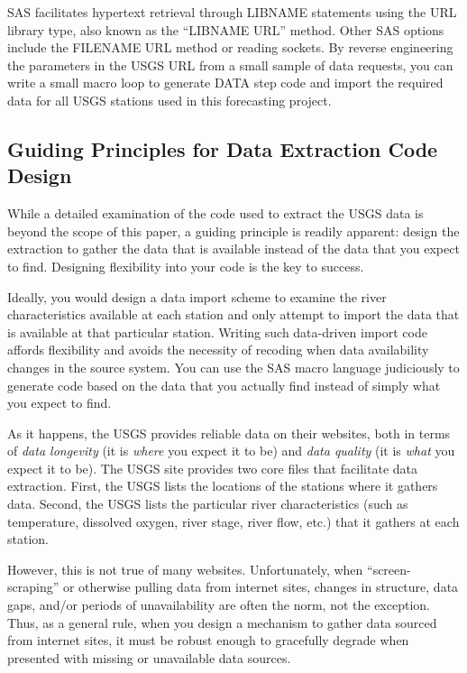 \documentclass[10pt]{sugconf-ish}
\begin{document}
SAS facilitates hypertext retrieval through LIBNAME statements using the URL library type, also known as the ``LIBNAME URL'' method. Other SAS options include the FILENAME URL method or reading sockets. By reverse engineering the parameters in the USGS URL from a small sample of data requests, you can write a small macro loop to generate DATA step code and import the required data for all USGS stations used in this forecasting project.


\subsection{Guiding Principles for Data Extraction Code Design}

While a detailed examination of the code used to extract the USGS data is beyond the scope of this paper, a guiding principle is readily apparent: design the extraction to gather the data that is available instead of the data that you expect to find. Designing flexibility into your code is the key to success.

Ideally, you would design a data import scheme to examine the river characteristics available at each station and only attempt to import the data that is available at that particular station. Writing such data-driven import code affords flexibility and avoids the necessity of recoding when data availability changes in the source system. You can use the SAS macro language judiciously to generate code based on the data that you actually find instead of simply what you expect to find.

As it happens, the USGS provides reliable data on their websites, both in terms of \emph{data longevity} (it is \emph{where} you expect it to be) and \emph{data quality} (it is \emph{what} you expect it to be). The USGS site provides two core files that facilitate data extraction. First, the USGS lists the locations of the stations where it gathers data. Second, the USGS lists the particular river characteristics (such as temperature, dissolved oxygen, river stage, river flow, etc.) that it gathers at each station.

However, this is not true of many websites. Unfortunately, when ``screen-scraping'' or otherwise pulling data from internet sites, changes in structure, data gaps, and/or periods of unavailability are often the norm, not the exception. Thus, as a general rule, when you design a mechanism to gather data sourced from internet sites, it must be robust enough to gracefully degrade when presented with missing or unavailable data sources.
\end{document}
